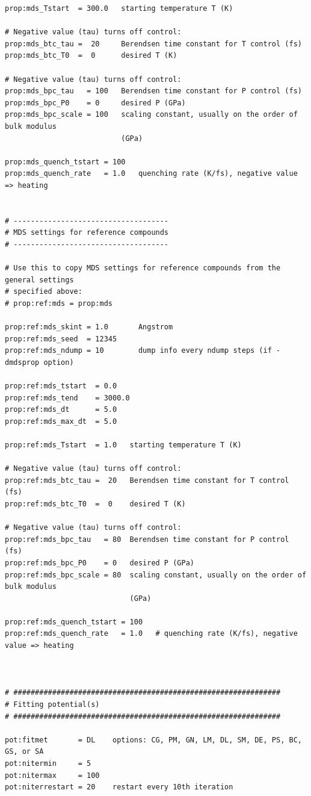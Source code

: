 \documentclass[a4paper,12pt,pdftex,onecolumn]{article}
\begin{document}
\begin{Verbatim}[fontsize=\relsize{-1},frame=single]
prop:mds_Tstart  = 300.0   starting temperature T (K)

# Negative value (tau) turns off control:
prop:mds_btc_tau =  20     Berendsen time constant for T control (fs)
prop:mds_btc_T0  =  0      desired T (K)

# Negative value (tau) turns off control:
prop:mds_bpc_tau   = 100   Berendsen time constant for P control (fs)
prop:mds_bpc_P0    = 0     desired P (GPa)
prop:mds_bpc_scale = 100   scaling constant, usually on the order of bulk modulus
                           (GPa)

prop:mds_quench_tstart = 100
prop:mds_quench_rate   = 1.0   quenching rate (K/fs), negative value => heating


# ------------------------------------
# MDS settings for reference compounds
# ------------------------------------

# Use this to copy MDS settings for reference compounds from the general settings
# specified above:
# prop:ref:mds = prop:mds

prop:ref:mds_skint = 1.0       Angstrom
prop:ref:mds_seed  = 12345
prop:ref:mds_ndump = 10        dump info every ndump steps (if -dmdsprop option)

prop:ref:mds_tstart  = 0.0
prop:ref:mds_tend    = 3000.0
prop:ref:mds_dt      = 5.0
prop:ref:mds_max_dt  = 5.0

prop:ref:mds_Tstart  = 1.0   starting temperature T (K)

# Negative value (tau) turns off control:
prop:ref:mds_btc_tau =  20   Berendsen time constant for T control (fs)
prop:ref:mds_btc_T0  =  0    desired T (K)

# Negative value (tau) turns off control:
prop:ref:mds_bpc_tau   = 80  Berendsen time constant for P control (fs)
prop:ref:mds_bpc_P0    = 0   desired P (GPa)
prop:ref:mds_bpc_scale = 80  scaling constant, usually on the order of bulk modulus
                             (GPa)

prop:ref:mds_quench_tstart = 100
prop:ref:mds_quench_rate   = 1.0   # quenching rate (K/fs), negative value => heating



# ##############################################################
# Fitting potential(s)
# ##############################################################

pot:fitmet       = DL    options: CG, PM, GN, LM, DL, SM, DE, PS, BC, GS, or SA
pot:nitermin     = 5
pot:nitermax     = 100
pot:niterrestart = 20    restart every 10th iteration


\end{Verbatim}
\end{document}

